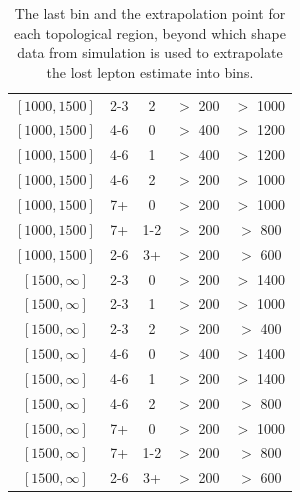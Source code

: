 \begin{table}
\begin{tabular}{c|c|c|c|c}
$[1000,1500]$ &2-3&2& $>$ 200& $>$ 1000\\
$[1000,1500]$ &4-6&0& $>$ 400& $>$ 1200\\
$[1000,1500]$ &4-6&1& $>$ 400& $>$ 1200\\
$[1000,1500]$ &4-6&2& $>$ 200& $>$ 1000\\
$[1000,1500]$ &7+&0& $>$ 200& $>$ 1000\\
$[1000,1500]$ &7+&1-2& $>$ 200& $>$ 800\\
$[1000,1500]$ &2-6&3+& $>$ 200& $>$ 600\\
$[1500,\infty]$ &2-3&0& $>$ 200& $>$ 1400\\
$[1500,\infty]$ &2-3&1& $>$ 200& $>$ 1000\\
$[1500,\infty]$ &2-3&2& $>$ 200& $>$ 400\\
$[1500,\infty]$ &4-6&0& $>$ 400& $>$ 1400\\
$[1500,\infty]$ &4-6&1& $>$ 200& $>$ 1400\\
$[1500,\infty]$ &4-6&2& $>$ 200& $>$ 800\\
$[1500,\infty]$ &7+&0& $>$ 200& $>$ 1000\\
$[1500,\infty]$ &7+&1-2& $>$ 200& $>$ 800\\
$[1500,\infty]$ &2-6&3+& $>$ 200& $>$ 600\\
\hline \hline
\end{tabular}
	\caption{The last \mttwo bin and the \mttwo extrapolation point for each topological region, beyond which shape data from simulation is used to extrapolate the lost lepton estimate into \mttwo bins.}
	\label{tbl:lostlepHybridPoint}
\end{table}
